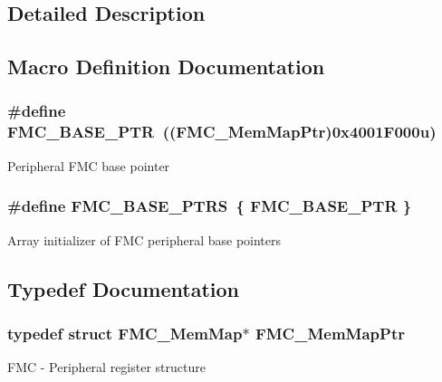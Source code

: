 \subsection{Detailed Description}


\subsection{Macro Definition Documentation}
\hypertarget{group___f_m_c___peripheral_ga0a740437b573e32e6b932bf729485fd9}{}
\subsubsection[{F\+M\+C\+\_\+\+B\+A\+S\+E\+\_\+\+P\+T\+R}]{\setlength{\rightskip}{0pt plus 5cm}\#define F\+M\+C\+\_\+\+B\+A\+S\+E\+\_\+\+P\+T\+R~(({\bf F\+M\+C\+\_\+\+Mem\+Map\+Ptr})0x4001\+F000u)}\label{group___f_m_c___peripheral_ga0a740437b573e32e6b932bf729485fd9}
Peripheral F\+M\+C base pointer \hypertarget{group___f_m_c___peripheral_ga7ad26eb02eedda3bb7e2863700c32017}{}
\subsubsection[{F\+M\+C\+\_\+\+B\+A\+S\+E\+\_\+\+P\+T\+R\+S}]{\setlength{\rightskip}{0pt plus 5cm}\#define F\+M\+C\+\_\+\+B\+A\+S\+E\+\_\+\+P\+T\+R\+S~\{ {\bf F\+M\+C\+\_\+\+B\+A\+S\+E\+\_\+\+P\+T\+R} \}}\label{group___f_m_c___peripheral_ga7ad26eb02eedda3bb7e2863700c32017}
Array initializer of F\+M\+C peripheral base pointers 

\subsection{Typedef Documentation}
\hypertarget{group___f_m_c___peripheral_ga0552c12b8b29667270d15450ed977a6e}{}
\subsubsection[{F\+M\+C\+\_\+\+Mem\+Map\+Ptr}]{\setlength{\rightskip}{0pt plus 5cm}typedef struct {\bf F\+M\+C\+\_\+\+Mem\+Map}$\ast$ {\bf F\+M\+C\+\_\+\+Mem\+Map\+Ptr}}\label{group___f_m_c___peripheral_ga0552c12b8b29667270d15450ed977a6e}
F\+M\+C -\/ Peripheral register structure 